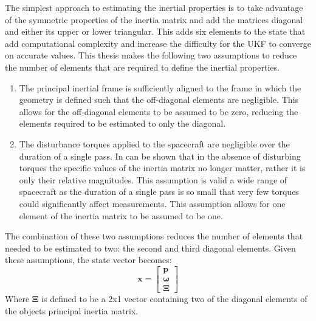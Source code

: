 The simplest approach to estimating the inertial properties is to take advantage of the symmetric properties of the inertia matrix and add the matrices diagonal and either its upper or lower triangular. This adds six elements to the state that add computational complexity and increase the difficulty for the UKF to converge on accurate values. This thesis makes the following two assumptions to reduce the number of elements that are required to define the inertial properties.
\begin{enumerate}
\item The principal inertial frame is sufficiently aligned to the frame in which the geometry is defined such that the off-diagonal elements are negligible. This allows for the off-diagonal elements to be assumed to be zero, reducing the elements required to be estimated to only the diagonal.

\item The disturbance torques applied to the spacecraft are negligible over the duration of a single pass. In can be shown that in the absence of disturbing torques the specific values of the inertia matrix no longer matter, rather it is only their relative magnitudes. This assumption is valid a wide range of spacecraft as the duration of a single pass is so small that very few torques could significantly affect measurements. This assumption allows for one element of the inertia matrix to be assumed to be one.
\end{enumerate}
The combination of these two assumptions reduces the number of elements that needed to be estimated to two: the second and third diagonal elements. Given these assumptions, the state vector becomes:
\begin{equation}
\bm{x} = \begin{bmatrix} \bm{p} \\ \bm{\omega} \\ \bm{\Xi} \end{bmatrix}
\end{equation}
Where $\bm{\Xi}$ is defined to be a 2x1 vector containing two of the diagonal elements of the objects principal inertia matrix.
